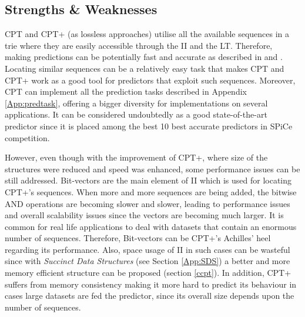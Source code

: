 \subsection{Strengths \& Weaknesses}

CPT and CPT+ (as lossless approaches) utilise all the available sequences in a trie where they are easily accessible through the II and the LT. Therefore, making predictions can be potentially fast and accurate as described in \citep{gueniche_fournier-viger_tseng_2013} and \citep{gueniche_fournier-viger_raman_tseng_2015}. Locating similar sequences can be a relatively easy task that makes CPT and CPT+ work as a good tool for predictors that exploit such sequences. Moreover, CPT can implement all the prediction tasks described in Appendix \ref{App:predtask}, offering a bigger diversity for implementations on several applications. It can be considered undoubtedly as a good state-of-the-art predictor since it is placed among the best 10 best accurate predictors in SPiCe \cite{balle:hal-01399429} competition.
\par However, even though with the improvement of CPT+, where size of the structures were reduced and speed was enhanced, some performance issues can be still addressed. Bit-vectors are the main element of II which is used for locating CPT+'s sequences. When more and more sequences are being added, the bitwise AND operations are becoming slower and slower, leading to performance issues and overall scalability issues since the vectors are becoming much larger. It is common for real life applications to deal with datasets that contain an enormous number of sequences. Therefore, Bit-vectors can be CPT+'s Achilles' heel regarding its performance. Also, space usage of II in such cases can be wasteful since with \emph{Succinct Data Structures} (see Section \ref{App:SDS}) a better and more memory efficient structure can be proposed (section \ref{ccpt}). In addition,  CPT+ suffers from memory consistency making it more hard to predict its behaviour in cases large datasets are fed the predictor, since its overall size depends upon the number of sequences. 
